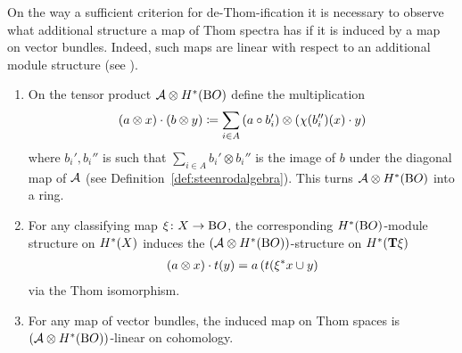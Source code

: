 On the way a sufficient criterion for de-Thom-ification it
is necessary to observe what additional structure a
map of Thom spectra has if it is induced by a map on vector bundles.
Indeed, such maps are linear with respect to an additional module structure
(see \cite[p.~107ff]{immersionconj}).
\begin{Lem*}
  \begin{enumerate}
  \item On the tensor product $\mathcal{A}\otimes H^*(\mathrm{B}O)$ define the multiplication
    \begin{gather*}
      (a\otimes x) \cdot (b\otimes y)
      \coloneqq \sum_{i\in A}
      \left(a\circ b_i'\right) \otimes \left(\chi(b_i'')(x)\cdot y\right)
    \end{gather*}
    where $b_i', b_i''$ is such that $\sum_{i\in A}b_i'\otimes b_i''$ is
    the image of $b$ under the diagonal map of $\mathcal{A}$
    (see Definition~\ref{def:steenrodalgebra}).
    This turns $\mathcal{A}\otimes H^*(\mathrm{B}O)$ into a ring.
  \item For any classifying map $\xi\colon X\to\mathrm{B}O$, the
    corresponding $H^*(\mathrm{B}O)$-module structure on $H^*(X)$
    induces the $(\mathcal{A}\otimes H^*(\mathrm{B}O))$-structure on $H^*(\bm{\mathrm{T}}{\xi})$
    \begin{gather*}
      (a\otimes x)\cdot t(y) = a\left( t({\xi}^* x\cup y \right)
    \end{gather*}
    via the Thom isomorphism.
  \item For any map of vector bundles, the induced map on Thom spaces
    is $(\mathcal{A}\otimes H^*(\mathrm{B}O))$-linear on cohomology.
  \end{enumerate}
\end{Lem*}

